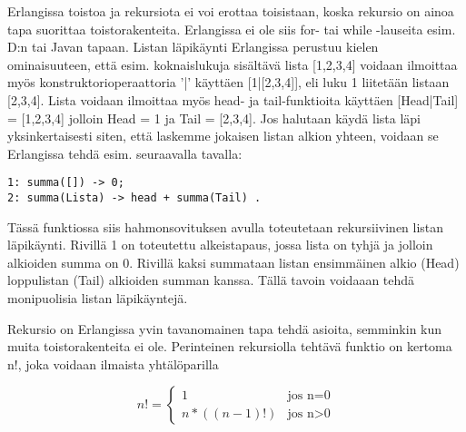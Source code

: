 \documentclass[11pt,oneside,a4paper]{article}
\begin{document}
Erlangissa toistoa ja rekursiota ei voi erottaa toisistaan, koska rekursio on
ainoa tapa suorittaa toistorakenteita. Erlangissa ei ole siis for- tai while
-lauseita esim. D:n tai Javan tapaan. Listan läpikäynti Erlangissa perustuu
kielen ominaisuuteen, että
esim. koknaislukuja sisältävä lista [1,2,3,4]  voidaan ilmoittaa myös
konstruktorioperaattoria '|' käyttäen [1|[2,3,4]], eli luku 1 liitetään listaan
[2,3,4]. Lista voidaan ilmoittaa myös head- ja tail-funktioita käyttäen
[Head|Tail] = [1,2,3,4] jolloin Head = 1 ja Tail = [2,3,4].
Jos halutaan käydä lista läpi yksinkertaisesti siten, että laskemme jokaisen
listan alkion yhteen, voidaan se Erlangissa tehdä esim. seuraavalla tavalla:

\begin{verbatim}
1: summa([]) -> 0;
2: summa(Lista) -> head + summa(Tail) .  
\end{verbatim}


Tässä funktiossa siis hahmonsovituksen avulla toteutetaan rekursiivinen listan
läpikäynti. Rivillä 1 on toteutettu alkeistapaus, jossa lista on tyhjä ja
jolloin alkioiden summa on 0. Rivillä kaksi summataan listan ensimmäinen alkio
(Head) loppulistan 
(Tail) alkioiden summan kanssa. Tällä tavoin voidaaan tehdä monipuolisia listan
läpikäyntejä. 

Rekursio on Erlangissa yvin tavanomainen tapa tehdä asioita, semminkin kun muita
toistorakenteita ei ole. Perinteinen rekursiolla tehtävä funktio on kertoma n!,
joka voidaan ilmaista yhtälöparilla 

\begin{displaymath}
n! = \left\{ \begin{array}{ll}
1 & \textrm{jos n=0}\\
n*((n-1)!) & \textrm{{jos n>0}}
\end{array} \right.
\end{displaymath}
\end{document}
